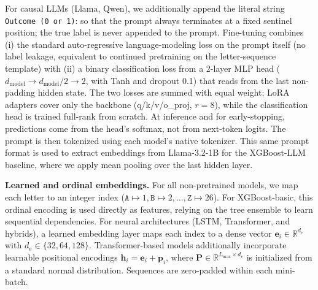 \documentclass[fullpaper]{nldl}
\theoremstyle{plain}
\theoremstyle{definition}
\theoremstyle{remark}
\begin{document}
For causal LLMs (Llama, Qwen), we additionally append the literal string \texttt{Outcome (0 or 1)}: so that the prompt always terminates at a fixed sentinel position; the true label is never appended to the prompt. Fine-tuning combines (i) the standard auto-regressive language-modeling loss on the prompt itself (no label leakage, equivalent to continued pretraining on the letter-sequence template) with (ii) a binary classification loss from a 2-layer MLP head ($d_{\text{model}} \to d_{\text{model}}/2 \to 2$, with Tanh and dropout 0.1) that reads from the last non-padding hidden state. The two losses are summed with equal weight; LoRA adapters cover only the backbone (q/k/v/o\_proj, $r{=}8$), while the classification head is trained full-rank from scratch. At inference and for early-stopping, predictions come from the head's softmax, not from next-token logits. The prompt is then tokenized using each model's native tokenizer. This same prompt format is used to extract embeddings from Llama-3.2-1B for the XGBoost-LLM baseline, where we apply mean pooling over the last hidden layer.

\textbf{Learned and ordinal embeddings.} For all non-pretrained models, we map each letter to an integer index ($\texttt{A} \mapsto 1, \texttt{B} \mapsto 2, \ldots, \texttt{Z} \mapsto 26$). For XGBoost-basic, this ordinal encoding is used directly as features, relying on the tree ensemble to learn sequential dependencies. For neural architectures (LSTM, Transformer, and hybrids), a learned embedding layer maps each index to a dense vector $\mathbf{e}_i \in \mathbb{R}^{d_e}$ with $d_e \in \{32, 64, 128\}$. Transformer-based models additionally incorporate learnable positional encodings $\mathbf{h}_i = \mathbf{e}_i + \mathbf{p}_i$, where $\mathbf{P} \in \mathbb{R}^{L_{\max} \times d_e}$ is initialized from a standard normal distribution. Sequences are zero-padded within each mini-batch.
\end{document}
